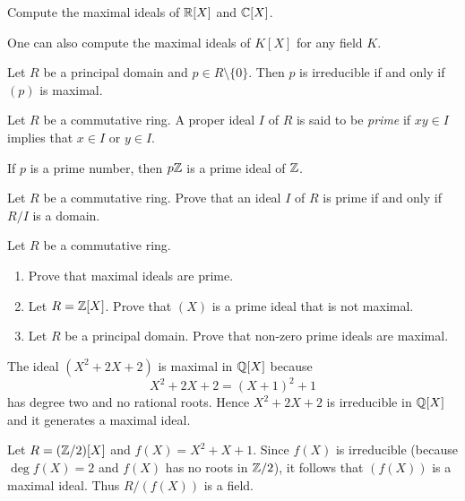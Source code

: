 \begin{exercise}
	Compute the maximal ideals of $\mathbb{R}[X]$ and $\mathbb{C}[X]$. 	
\end{exercise}

One can also compute the maximal ideals of $K[X]$ for any field $K$. 

\begin{exercise}
	Let $R$ be a principal domain and $p\in R\setminus\{0\}$. 
	Then $p$ is irreducible 
	if and only if $(p)$ is maximal.	
\end{exercise}

\begin{definition}
Let $R$ be a commutative ring. A proper ideal $I$ of $R$ is said to be
\emph{prime} if $xy\in I$ implies that $x\in I$ or $y\in I$. 
\end{definition}

If $p$ is a prime number, then $p\mathbb{Z}$ is a prime ideal of $\mathbb{Z}$.

\begin{exercise}
\label{xca:prime<=>domain}
    Let $R$ be a commutative ring. 
    Prove that an ideal $I$ of $R$ is prime if and only if $R/I$ is a domain. 
\end{exercise}

\begin{exercise}
Let $R$ be a commutative ring. 
\label{xca:maximal=>prime}
\begin{enumerate}
    \item Prove that maximal ideals are prime. 
    \item Let $R=\mathbb{Z}[X]$. Prove that $(X)$ is a prime ideal that is not maximal.
    \item Let $R$ be a principal domain. Prove that non-zero 
    prime ideals are maximal. 
\end{enumerate}
\end{exercise}

\begin{example}
	The ideal $(X^2+2X+2)$ is maximal in $\mathbb{Q}[X]$ because
	\[
	X^2+2X+2=(X+1)^2+1
	\]
	has degree two and no rational roots. 
	Hence $X^2+2X+2$ is irreducible in $\mathbb{Q}[X]$ and it generates 
	a maximal ideal. 	
\end{example}


\begin{example}
  Let $R=(\mathbb{Z}/2)[X]$ and $f(X)=X^2+X+1$. Since $f(X)$ is irreducible (because
  $\deg f(X)=2$ and $f(X)$ has no roots in $\mathbb{Z}/2$), it follows that $(f(X))$ is
  a maximal ideal.  Thus $R/(f(X))$ is a field. 
\end{example}

